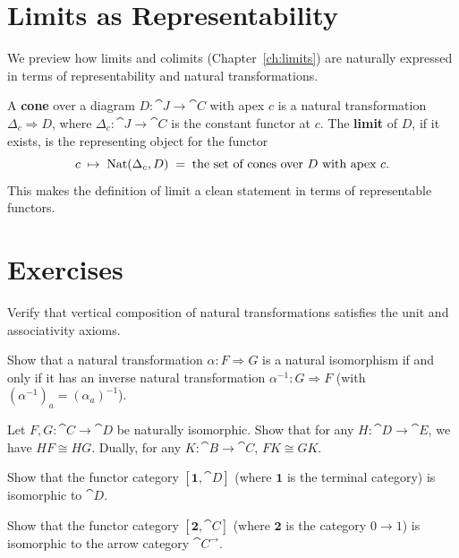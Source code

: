 \section{Limits as Representability}
\label{sec:limits-as-rep}

We preview how limits and colimits (Chapter~\ref{ch:limits}) are naturally expressed in terms of representability and natural transformations.

A \textbf{cone} over a diagram $D: \cat{J} \to \cat{C}$ with apex $c$ is a natural transformation $\Delta_c \Rightarrow D$, where $\Delta_c: \cat{J} \to \cat{C}$ is the constant functor at $c$. The \textbf{limit} of $D$, if it exists, is the representing object for the functor
\[
  c \;\mapsto\; \operatorname{Nat}(\Delta_c, D) \;=\; \text{the set of cones over } D \text{ with apex } c.
\]
This makes the definition of limit a clean statement in terms of representable functors.

\section{Exercises}

\begin{exercise}
Verify that vertical composition of natural transformations satisfies the unit and associativity axioms.
\end{exercise}

\begin{exercise}
Show that a natural transformation $\alpha: F \Rightarrow G$ is a natural isomorphism if and only if it has an inverse natural transformation $\alpha^{-1}: G \Rightarrow F$ (with $(\alpha^{-1})_a = (\alpha_a)^{-1}$).
\end{exercise}

\begin{exercise}
Let $F, G: \cat{C} \to \cat{D}$ be naturally isomorphic. Show that for any $H: \cat{D} \to \cat{E}$, we have $HF \cong HG$. Dually, for any $K: \cat{B} \to \cat{C}$, $FK \cong GK$.
\end{exercise}

\begin{exercise}
Show that the functor category $[\mathbf{1}, \cat{D}]$ (where $\mathbf{1}$ is the terminal category) is isomorphic to $\cat{D}$.
\end{exercise}

\begin{exercise}
Show that the functor category $[\mathbf{2}, \cat{C}]$ (where $\mathbf{2}$ is the category $0 \to 1$) is isomorphic to the arrow category $\cat{C}^{\to}$.
\end{exercise}


